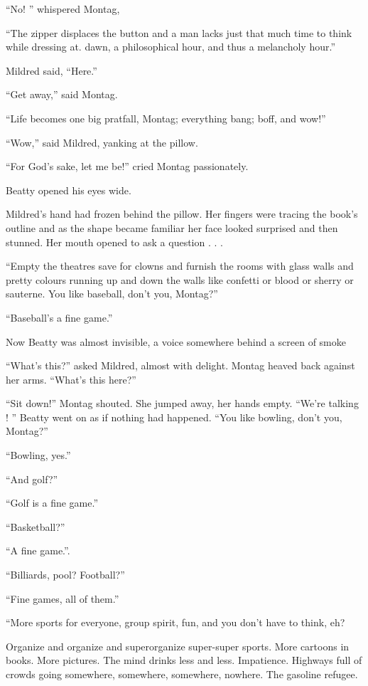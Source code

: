 \documentclass[11pt,openany]{book}
\begin{document}
``No! '' whispered Montag,

``The zipper displaces the button and a man lacks just that much time to think while dressing at. dawn, a philosophical hour, and thus a melancholy hour.''

Mildred said, ``Here.''

``Get away,'' said Montag.

``Life becomes one big pratfall, Montag; everything bang; boff, and wow!''

``Wow,'' said Mildred, yanking at the pillow.

``For God's sake, let me be!'' cried Montag passionately.

Beatty opened his eyes wide.

Mildred's hand had frozen behind the pillow. Her fingers were tracing the book's outline and as the shape became familiar her face looked surprised and then stunned. Her mouth opened to ask a question . . .

``Empty the theatres save for clowns and furnish the rooms with glass walls and pretty colours running up and down the walls like confetti or blood or sherry or sauterne. You like baseball, don't you, Montag?''

``Baseball's a fine game.''

Now Beatty was almost invisible, a voice somewhere behind a screen of smoke

``What's this?'' asked Mildred, almost with delight. Montag heaved back against her arms. ``What's this here?''

``Sit down!'' Montag shouted. She jumped away, her hands empty. ``We're talking ! '' Beatty went on as if nothing had happened. ``You like bowling, don't you, Montag?''

``Bowling, yes.''

``And golf?''

``Golf is a fine game.''

``Basketball?''

``A fine game.''.

``Billiards, pool? Football?''

``Fine games, all of them.''

``More sports for everyone, group spirit, fun, and you don't have to think, eh?

Organize and organize and superorganize super-super sports. More cartoons in books. More pictures. The mind drinks less and less. Impatience. Highways full of crowds going somewhere, somewhere, somewhere, nowhere. The gasoline refugee.
\end{document}
